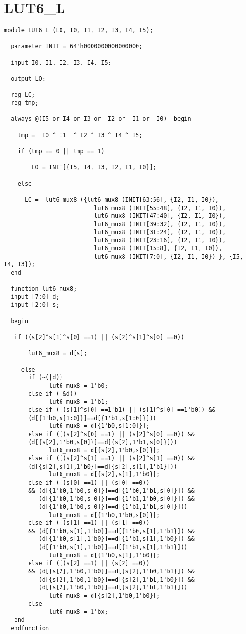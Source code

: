 \section{LUT6\_L}
\begin{lstlisting}
module LUT6_L (LO, I0, I1, I2, I3, I4, I5);

  parameter INIT = 64'h0000000000000000;

  input I0, I1, I2, I3, I4, I5;

  output LO;

  reg LO;
  reg tmp;

  always @(I5 or I4 or I3 or  I2 or  I1 or  I0)  begin
 
    tmp =  I0 ^ I1  ^ I2 ^ I3 ^ I4 ^ I5;

    if (tmp == 0 || tmp == 1)

        LO = INIT[{I5, I4, I3, I2, I1, I0}];

    else 
    
      LO =  lut6_mux8 ({lut6_mux8 (INIT[63:56], {I2, I1, I0}),
                          lut6_mux8 (INIT[55:48], {I2, I1, I0}),
                          lut6_mux8 (INIT[47:40], {I2, I1, I0}),
                          lut6_mux8 (INIT[39:32], {I2, I1, I0}),
                          lut6_mux8 (INIT[31:24], {I2, I1, I0}),
                          lut6_mux8 (INIT[23:16], {I2, I1, I0}),
                          lut6_mux8 (INIT[15:8], {I2, I1, I0}),
                          lut6_mux8 (INIT[7:0], {I2, I1, I0}) }, {I5, I4, I3});
  end

  function lut6_mux8;
  input [7:0] d;
  input [2:0] s;
   
  begin

   if ((s[2]^s[1]^s[0] ==1) || (s[2]^s[1]^s[0] ==0))
           
       lut6_mux8 = d[s];

     else
       if (~(|d))
             lut6_mux8 = 1'b0;
       else if ((&d))
             lut6_mux8 = 1'b1;
       else if (((s[1]^s[0] ==1'b1) || (s[1]^s[0] ==1'b0)) &&
       (d[{1'b0,s[1:0]}]==d[{1'b1,s[1:0]}]))
             lut6_mux8 = d[{1'b0,s[1:0]}];
       else if (((s[2]^s[0] ==1) || (s[2]^s[0] ==0)) &&
       (d[{s[2],1'b0,s[0]}]==d[{s[2],1'b1,s[0]}]))
             lut6_mux8 = d[{s[2],1'b0,s[0]}];
       else if (((s[2]^s[1] ==1) || (s[2]^s[1] ==0)) && 
       (d[{s[2],s[1],1'b0}]==d[{s[2],s[1],1'b1}]))
             lut6_mux8 = d[{s[2],s[1],1'b0}];
       else if (((s[0] ==1) || (s[0] ==0))
       && (d[{1'b0,1'b0,s[0]}]==d[{1'b0,1'b1,s[0]}]) &&
          (d[{1'b0,1'b0,s[0]}]==d[{1'b1,1'b0,s[0]}]) && 
          (d[{1'b0,1'b0,s[0]}]==d[{1'b1,1'b1,s[0]}]))
             lut6_mux8 = d[{1'b0,1'b0,s[0]}];
       else if (((s[1] ==1) || (s[1] ==0)) 
       && (d[{1'b0,s[1],1'b0}]==d[{1'b0,s[1],1'b1}]) &&
          (d[{1'b0,s[1],1'b0}]==d[{1'b1,s[1],1'b0}]) &&
          (d[{1'b0,s[1],1'b0}]==d[{1'b1,s[1],1'b1}]))
             lut6_mux8 = d[{1'b0,s[1],1'b0}];
       else if (((s[2] ==1) || (s[2] ==0))
       && (d[{s[2],1'b0,1'b0}]==d[{s[2],1'b0,1'b1}]) &&
          (d[{s[2],1'b0,1'b0}]==d[{s[2],1'b1,1'b0}]) &&
          (d[{s[2],1'b0,1'b0}]==d[{s[2],1'b1,1'b1}]))
             lut6_mux8 = d[{s[2],1'b0,1'b0}];
       else
             lut6_mux8 = 1'bx;
   end
  endfunction


\end{lstlisting}
